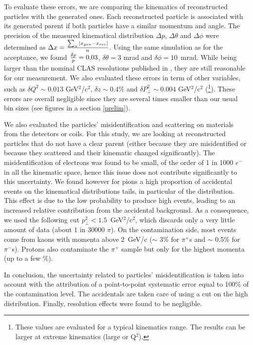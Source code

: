 To evaluate these errors, we are comparing the kinematics of reconstructed 
particles with the generated ones. Each reconstructed particle is associated 
with its generated parent if both particles have a similar momentum and 
angle. The precision of the measured kinematical distribution 
$\Delta p$, $\Delta \theta$ and $\Delta \phi$ were determined as $\Delta x = 
{\sum_n |x_{gen} - x_{rec}| \over n}$. Using the same simulation as for 
the acceptance, we found 
${\delta p \over p } = 0.03$, $\delta \theta = 3$ mrad and $\delta \phi = 
10$~mrad. While being larger than the nominal CLAS resolutions published in 
\cite{Mecking:2003zu}, they are still reasonable for our measurement. We also 
evaluated these errors in term of other variables, such as 
$\delta Q^2 \sim 0.013$ GeV$^2$/c$^2$, $\delta z \sim 0.4 \%$ and $\delta 
P_\perp^2 \sim 0.004$ GeV$^2$/c$^2$ (\footnote{These values are evaluated for 
a typical kinematics range. The results can be larger at extreme kinematics 
(large \pt or Q$^2$).}). These errors are overall negligible since they are 
several times smaller than our usual bin sizes (see figures in a section 
\ref{prelim}). 

We also evaluated the particles' misidentification and scattering on materials
from the detectors or coils. For this study, we are looking at reconstructed 
particles that do not have a clear parent (either because they are misidentified
or because they scattered and their kinematic changed significantly). The 
misidentification of electrons was found to be small, of the order of 1 in 
1000 $e^-$ in all the kinematic space, hence this issue does not contribute 
significantly to this uncertainty. We found however for pions
a high proportion of accidental events on the kinematical distributions tails, 
in particular of the \pt distribution. This effect is due to the low 
probability to produce high \pt events, leading to an increased relative 
contribution from the accidental background. As a consequence, we used the 
following cut $p_\perp^2 < 1.5$~GeV$^2$/c$^2$, which discards only a very 
little amount of data (about 1 in 30000 $\pi$). On the contamination side,
most events come from kaons with momenta above 2~GeV/c ($\sim$ 3\% for 
$\pi^+$s and $\sim$ 0.5\% for $\pi^-$s). Protons also contaminate the 
$\pi^+$ sample but only for the highest momenta (up to a few \%). 

In conclusion, the uncertainty related to particles' misidentification is 
taken into account with the attribution of a point-to-point systematic 
error equal to 100\% of the contamination level. The accidentals are taken 
care of using a cut on the high \pt distribution. Finally, resolution effects
were found to be negligible.

